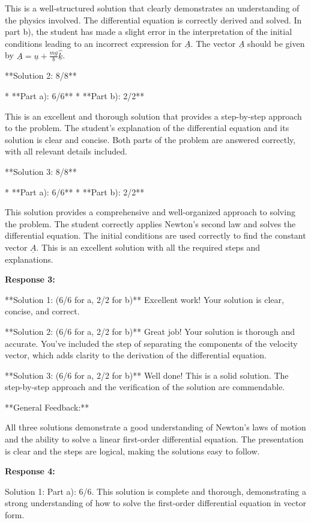 \documentclass[a4paper,11pt]{article}
\begin{document}
This is a well-structured solution that clearly demonstrates an understanding of the physics involved. The differential equation is correctly derived and solved. In part b), the student has made a slight error in the interpretation of the initial conditions leading to an incorrect expression for \(\underline{A}\). The vector \(\underline{A}\) should be given by \( \underline{A} = \underline{u} + \frac{mg}{b}\hat{\underline{k}} \).

**Solution 2: 8/8**

*   **Part a): 6/6**
*   **Part b): 2/2**

This is an excellent and thorough solution that provides a step-by-step approach to the problem. The student's explanation of the differential equation and its solution is clear and concise. Both parts of the problem are answered correctly, with all relevant details included.

**Solution 3: 8/8**

*   **Part a): 6/6**
*   **Part b): 2/2**

This solution provides a comprehensive and well-organized approach to solving the problem. The student correctly applies Newton's second law and solves the differential equation. The initial conditions are used correctly to find the constant vector \(\underline{A}\). This is an excellent solution with all the required steps and explanations.

\bigskip    
\textbf{Response 3:}

**Solution 1: (6/6 for a, 2/2 for b)**
Excellent work! Your solution is clear, concise, and correct.

**Solution 2: (6/6 for a, 2/2 for b)**
Great job! Your solution is thorough and accurate. You've included the step of separating the components of the velocity vector, which adds clarity to the derivation of the differential equation.

**Solution 3: (6/6 for a, 2/2 for b)**
Well done! This is a solid solution. The step-by-step approach and the verification of the solution are commendable.

**General Feedback:**

All three solutions demonstrate a good understanding of Newton's laws of motion and the ability to solve a linear first-order differential equation. The presentation is clear and the steps are logical, making the solutions easy to follow. 

\bigskip    
\textbf{Response 4:}

Solution 1:
Part a): 6/6. This solution is complete and thorough, demonstrating a strong understanding of how to solve the first-order differential equation in vector form. 
\end{document}

